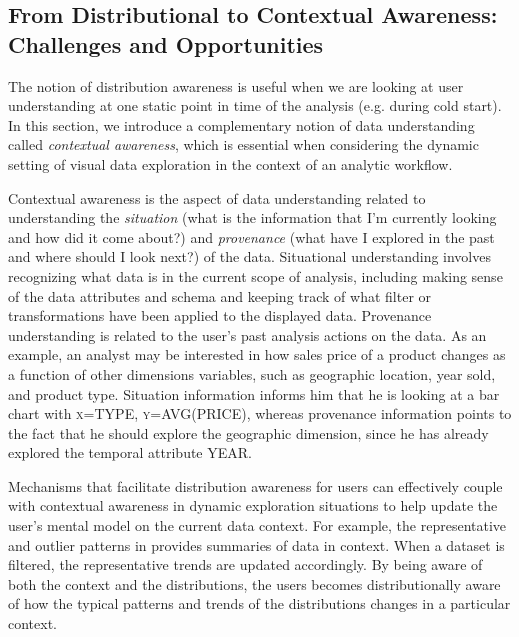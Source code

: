 \subsection{From Distributional to Contextual Awareness: Challenges and Opportunities}
\par The notion of distribution awareness is useful when we are looking at user understanding at one static point in time of the analysis (e.g. during cold start). In this section, we introduce a complementary notion of data understanding called \textit{contextual awareness}, which is essential when considering the dynamic setting of visual data exploration in the context of an analytic workflow.
\par Contextual awareness is the aspect of data understanding related to understanding the \textit{situation} (what is the information that I'm currently looking and how did it come about?) and \textit{provenance} (what have I explored in the past and where should I look next?) of the data. Situational understanding involves recognizing what data is in the current scope of analysis, including making sense of the data attributes and schema and keeping track of what filter or transformations have been applied to the displayed data. Provenance understanding is related to the user's past analysis actions on the data. As an example, an analyst may be interested in how sales price of a product changes as a function of other dimensions variables, such as geographic location, year sold, and product type. Situation information informs him that he is looking at a bar chart with \textsc{x=TYPE}, \textsc{y=AVG(PRICE)}, whereas provenance information points to the fact that he should explore the geographic dimension, since he has already explored the temporal attribute \textsc{YEAR}.
\par Mechanisms that facilitate distribution awareness for users can effectively couple with contextual awareness in dynamic exploration situations to help update the user's mental model on the current data context. For example, the representative and outlier patterns in \zv provides summaries of data in context. When a dataset is filtered, the representative trends are updated accordingly. By being aware of both the context and the distributions, the users becomes distributionally aware of how the typical patterns and trends of the distributions changes in a particular context. %
